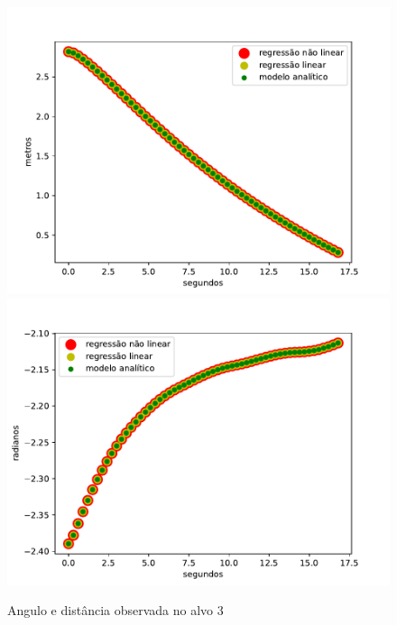 \begin{figure}[H]
    \centering
    \includegraphics[scale=0.45]{figuras/distance_over_time_3.pdf}
    \includegraphics[scale=0.45]{figuras/angle_over_time_3.pdf}
    \caption{Angulo e distância observada no alvo 3}
\end{figure}

